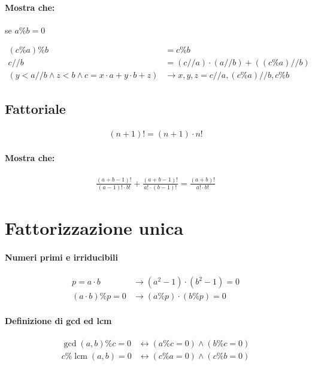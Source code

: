 \documentclass{article}
\begin{document}
\paragraph{Mostra che:} se $a \% b = 0$

\begin{align*}
(c \% a) \% b &= c \% b\\
c // b &= (c // a) \cdot (a // b) + ((c \% a) // b)\\
(y < a // b \land z < b \land c = x \cdot a + y \cdot b + z) &\rightarrow x, y, z = c // a, (c \% a) // b, c \% b
\end{align*}

\subsection*{Fattoriale}

\begin{align*}
(n + 1)! = (n + 1) \cdot n!
\end{align*}

\paragraph{Mostra che:}

\begin{align*}
\frac{(a + b - 1)!}{(a - 1)! \cdot b!} + \frac{(a + b - 1)!}{a! \cdot (b - 1)!} = \frac{(a + b)!}{a! \cdot b!}
\end{align*}

\newpage
\section*{Fattorizzazione unica}

\paragraph{Numeri primi e irriducibili}

\begin{align*}
p = a \cdot b &\longrightarrow (a^2 - 1) \cdot (b^2 - 1) = 0\\
(a \cdot b) \% p = 0 &\longrightarrow (a \% p) \cdot (b \% p) = 0
\end{align*}

\paragraph{Definizione di gcd ed lcm}

\begin{align*}
\operatorname{gcd}(a, b) \% c = 0 &\longleftrightarrow (a \% c = 0) \land (b \% c = 0)\\
c \% \operatorname{lcm}(a, b) = 0 &\longleftrightarrow (c \% a = 0) \land (c \% b = 0)
\end{align*}
\end{document}
